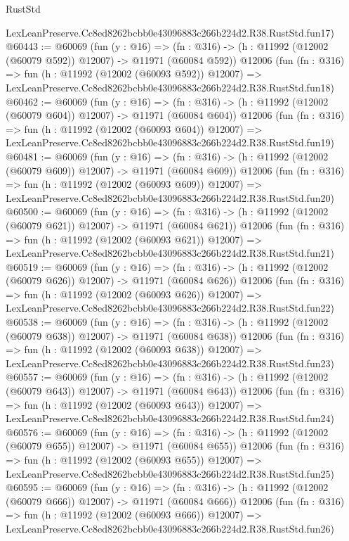 \begin{lexlean}{RustStd}
\begin{coremodule}
    LexLeanPreserve.Cc8ed8262bcbb0e43096883c266b224d2.R38.RustStd.fun17)
@60443 := @60069
    (fun (y : @16) =>
    (fn : @316) -> (h : @11992 (@12002 (@60079 @592)) @12007) -> @11971 (@60084 @592))
    @12006
    (fun (fn : @316) =>
    fun (h : @11992 (@12002 (@60093 @592)) @12007) =>
    LexLeanPreserve.Cc8ed8262bcbb0e43096883c266b224d2.R38.RustStd.fun18)
@60462 := @60069
    (fun (y : @16) =>
    (fn : @316) -> (h : @11992 (@12002 (@60079 @604)) @12007) -> @11971 (@60084 @604))
    @12006
    (fun (fn : @316) =>
    fun (h : @11992 (@12002 (@60093 @604)) @12007) =>
    LexLeanPreserve.Cc8ed8262bcbb0e43096883c266b224d2.R38.RustStd.fun19)
@60481 := @60069
    (fun (y : @16) =>
    (fn : @316) -> (h : @11992 (@12002 (@60079 @609)) @12007) -> @11971 (@60084 @609))
    @12006
    (fun (fn : @316) =>
    fun (h : @11992 (@12002 (@60093 @609)) @12007) =>
    LexLeanPreserve.Cc8ed8262bcbb0e43096883c266b224d2.R38.RustStd.fun20)
@60500 := @60069
    (fun (y : @16) =>
    (fn : @316) -> (h : @11992 (@12002 (@60079 @621)) @12007) -> @11971 (@60084 @621))
    @12006
    (fun (fn : @316) =>
    fun (h : @11992 (@12002 (@60093 @621)) @12007) =>
    LexLeanPreserve.Cc8ed8262bcbb0e43096883c266b224d2.R38.RustStd.fun21)
@60519 := @60069
    (fun (y : @16) =>
    (fn : @316) -> (h : @11992 (@12002 (@60079 @626)) @12007) -> @11971 (@60084 @626))
    @12006
    (fun (fn : @316) =>
    fun (h : @11992 (@12002 (@60093 @626)) @12007) =>
    LexLeanPreserve.Cc8ed8262bcbb0e43096883c266b224d2.R38.RustStd.fun22)
@60538 := @60069
    (fun (y : @16) =>
    (fn : @316) -> (h : @11992 (@12002 (@60079 @638)) @12007) -> @11971 (@60084 @638))
    @12006
    (fun (fn : @316) =>
    fun (h : @11992 (@12002 (@60093 @638)) @12007) =>
    LexLeanPreserve.Cc8ed8262bcbb0e43096883c266b224d2.R38.RustStd.fun23)
@60557 := @60069
    (fun (y : @16) =>
    (fn : @316) -> (h : @11992 (@12002 (@60079 @643)) @12007) -> @11971 (@60084 @643))
    @12006
    (fun (fn : @316) =>
    fun (h : @11992 (@12002 (@60093 @643)) @12007) =>
    LexLeanPreserve.Cc8ed8262bcbb0e43096883c266b224d2.R38.RustStd.fun24)
@60576 := @60069
    (fun (y : @16) =>
    (fn : @316) -> (h : @11992 (@12002 (@60079 @655)) @12007) -> @11971 (@60084 @655))
    @12006
    (fun (fn : @316) =>
    fun (h : @11992 (@12002 (@60093 @655)) @12007) =>
    LexLeanPreserve.Cc8ed8262bcbb0e43096883c266b224d2.R38.RustStd.fun25)
@60595 := @60069
    (fun (y : @16) =>
    (fn : @316) -> (h : @11992 (@12002 (@60079 @666)) @12007) -> @11971 (@60084 @666))
    @12006
    (fun (fn : @316) =>
    fun (h : @11992 (@12002 (@60093 @666)) @12007) =>
    LexLeanPreserve.Cc8ed8262bcbb0e43096883c266b224d2.R38.RustStd.fun26)

\end{coremodule}
\end{lexlean}
